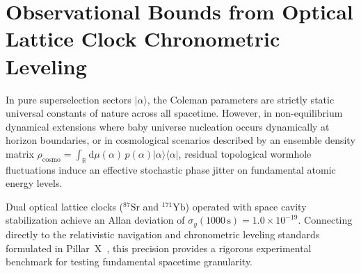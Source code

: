 \documentclass[11pt,a4paper,reqno]{article}
\theoremstyle{plain}
\theoremstyle{definition}
\theoremstyle{remark}
\numberwithin{equation}{section}
\newcommand{\R}{\mathbb{R}}
\newcommand{\diff}{\mathrm{d}}
\begin{document}
\section{Observational Bounds from Optical Lattice Clock Chronometric Leveling}
\label{sec:clock_decoherence}

In pure superselection sectors $|\alpha\rangle$, the Coleman parameters are strictly static universal constants of nature across all spacetime. However, in non-equilibrium dynamical extensions where baby universe nucleation occurs dynamically at horizon boundaries, or in cosmological scenarios described by an ensemble density matrix $\rho_{\mathrm{cosmo}} = \int_{\R} \diff\mu(\alpha) \, p(\alpha) |\alpha\rangle\langle\alpha|$, residual topological wormhole fluctuations induce an effective stochastic phase jitter on fundamental atomic energy levels.

Dual optical lattice clocks ($^{87}\mathrm{Sr}$ and $^{171}\mathrm{Yb}$) operated with space cavity stabilization achieve an Allan deviation of $\sigma_y(1000\,\mathrm{s}) = 1.0 \times 10^{-19}$. Connecting directly to the relativistic navigation and chronometric leveling standards formulated in Pillar~X~\cite{PillarXMonograph2026}, this precision provides a rigorous experimental benchmark for testing fundamental spacetime granularity.
\end{document}
